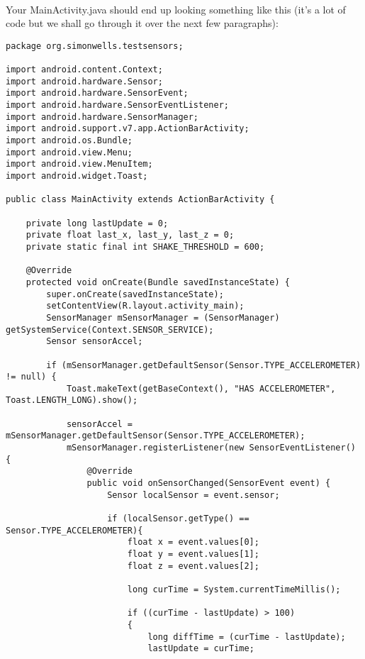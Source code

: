 \paragraph{} Your MainActivity.java should end up looking something like this (it's a lot of code but we shall go through it over the next few paragraphs):

\begin{lstlisting}
package org.simonwells.testsensors;

import android.content.Context;
import android.hardware.Sensor;
import android.hardware.SensorEvent;
import android.hardware.SensorEventListener;
import android.hardware.SensorManager;
import android.support.v7.app.ActionBarActivity;
import android.os.Bundle;
import android.view.Menu;
import android.view.MenuItem;
import android.widget.Toast;

public class MainActivity extends ActionBarActivity {

    private long lastUpdate = 0;
    private float last_x, last_y, last_z = 0;
    private static final int SHAKE_THRESHOLD = 600;

    @Override
    protected void onCreate(Bundle savedInstanceState) {
        super.onCreate(savedInstanceState);
        setContentView(R.layout.activity_main);
        SensorManager mSensorManager = (SensorManager) getSystemService(Context.SENSOR_SERVICE);
        Sensor sensorAccel;

        if (mSensorManager.getDefaultSensor(Sensor.TYPE_ACCELEROMETER) != null) {
            Toast.makeText(getBaseContext(), "HAS ACCELEROMETER", Toast.LENGTH_LONG).show();

            sensorAccel = mSensorManager.getDefaultSensor(Sensor.TYPE_ACCELEROMETER);
            mSensorManager.registerListener(new SensorEventListener() {
                @Override
                public void onSensorChanged(SensorEvent event) {
                    Sensor localSensor = event.sensor;

                    if (localSensor.getType() == Sensor.TYPE_ACCELEROMETER){
                        float x = event.values[0];
                        float y = event.values[1];
                        float z = event.values[2];

                        long curTime = System.currentTimeMillis();

                        if ((curTime - lastUpdate) > 100)
                        {
                            long diffTime = (curTime - lastUpdate);
                            lastUpdate = curTime;


\end{lstlisting}
